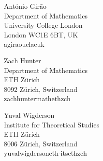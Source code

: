 \documentclass{aic}
\theoremstyle{plain}
\theoremstyle{remark}
\begin{document}
% 



\begin{aicauthors}
\begin{authorinfo}[antonio]
Ant\'onio Gir\~ao\\
Department of Mathematics\\
University College London\\
London WC1E 6BT, UK\\
a\imagedot{}girao\imageat{}ucl\imagedot{}ac\imagedot{}uk
\end{authorinfo}
\begin{authorinfo}[zach]
Zach Hunter\\
Department of Mathematics\\
ETH Z\"urich\\
8092 Z\"urich, Switzerland\\
zach\imagedot{}hunter\imageat{}math\imagedot{}ethz\imagedot{}ch
\end{authorinfo}
\begin{authorinfo}[yuval]
Yuval Wigderson\\
Institute for Theoretical Studies\\
ETH Z\"urich\\
8006 Z\"urich, Switzerland\\
yuval\imagedot{}wigderson\imageat{}eth-its\imagedot{}ethz\imagedot{}ch
\end{authorinfo}
\end{aicauthors}
\end{document}
